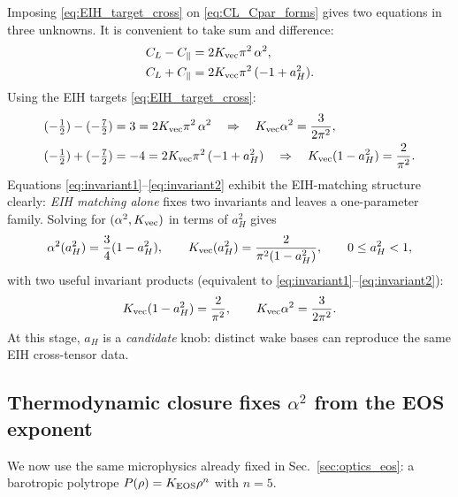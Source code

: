 \documentclass[11pt]{article}
\begin{document}
Imposing \eqref{eq:EIH_target_cross} on \eqref{eq:CL_Cpar_forms} gives two equations in three unknowns.
It is convenient to take sum and difference:
\begin{align}
  C_L-C_\parallel &= 2K_{\rm vec}\pi^2\,\alpha^2,
  \label{eq:diff_CL_Cpar}\\
  C_L+C_\parallel &= 2K_{\rm vec}\pi^2\,(-1+a_H^2).
  \label{eq:sum_CL_Cpar}
\end{align}
Using the EIH targets \eqref{eq:EIH_target_cross}:
\begin{align}
  (-\tfrac12)-(-\tfrac72) &= 3 = 2K_{\rm vec}\pi^2\,\alpha^2
  \quad\Rightarrow\quad
  K_{\rm vec}\alpha^2=\frac{3}{2\pi^2},
  \label{eq:invariant1}\\
  (-\tfrac12)+(-\tfrac72) &= -4 = 2K_{\rm vec}\pi^2\,(-1+a_H^2)
  \quad\Rightarrow\quad
  K_{\rm vec}(1-a_H^2)=\frac{2}{\pi^2}.
  \label{eq:invariant2}
\end{align}
Equations \eqref{eq:invariant1}--\eqref{eq:invariant2} exhibit the EIH-matching structure clearly:
\emph{EIH matching alone} fixes two invariants and leaves a one-parameter family.
Solving for $(\alpha^2,K_{\rm vec})$ in terms of $a_H^2$ gives
\begin{equation}
  \alpha^2(a_H^2)=\frac{3}{4}(1-a_H^2),
  \qquad
  K_{\rm vec}(a_H^2)=\frac{2}{\pi^2(1-a_H^2)},
  \qquad
  0\le a_H^2<1,
  \label{eq:family_alphaK}
\end{equation}
with two useful invariant products (equivalent to \eqref{eq:invariant1}--\eqref{eq:invariant2}):
\begin{equation}
  K_{\rm vec}(1-a_H^2)=\frac{2}{\pi^2},
  \qquad
  K_{\rm vec}\alpha^2=\frac{3}{2\pi^2}.
  \label{eq:family_invariants}
\end{equation}
At this stage, $a_H$ is a \emph{candidate} knob: distinct wake bases can reproduce the same EIH cross-tensor data.

\subsection{Thermodynamic closure fixes \texorpdfstring{$\alpha^2$}{alpha squared} from the EOS exponent}
\label{sec:1pn-interaction-thermo}

We now use the same microphysics already fixed in Sec.~\ref{sec:optics_eos}:
a barotropic polytrope $P(\rho)=K_{\rm EOS}\rho^n$ with $n=5$.
\end{document}
